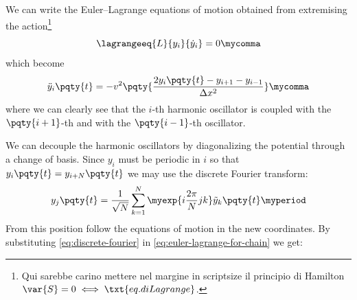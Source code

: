         We can write the Euler--Lagrange equations of motion obtained from extremising the action\footnote{Qui sarebbe carino mettere nel margine in scriptsize il principio di Hamilton $\var{S} = 0\iff\txt{eq. di Lagrange}$.}
        \begin{equation}
            \lagrangeeq{L}{y_i}{\dot{y}_i} = 0
            \mycomma
        \end{equation}
        which become
        \begin{equation}
            \label{eq:euler-lagrange-for-chain}
            \ddot{y}_{i}\pqty{t} = -v^{2} \pqty{\frac{2 y_{i}\pqty{t} - y_{i+1} - y_{i-1}}{\Delta x^2}}
            \mycomma
        \end{equation}
        where we can clearly see that the $i$-th harmonic oscillator is coupled with the $\pqty{i+1}$-th and with the $\pqty{i-1}$-th oscillator.

        We can decouple the harmonic oscillators by diagonalizing the potential through a change of basis. Since $y_i$ must be periodic in $i$ so that $y_i\pqty{t} = y_{i+N}\pqty{t}$ we may use the discrete Fourier transform:
        \begin{equation}
            \label{eq:discrete-fourier}
            y_{j}\pqty{t} = \frac{1}{\sqrt{N}} \sum_{k=1}^N \myexp{i \frac{2 \pi}{N}jk} \tilde{y}_k\pqty{t}
            \myperiod
        \end{equation}
        From this position follow the equations of motion in the new coordinates. By substituting \eqref{eq:discrete-fourier} in \eqref{eq:euler-lagrange-for-chain} we get:
% 
% 









